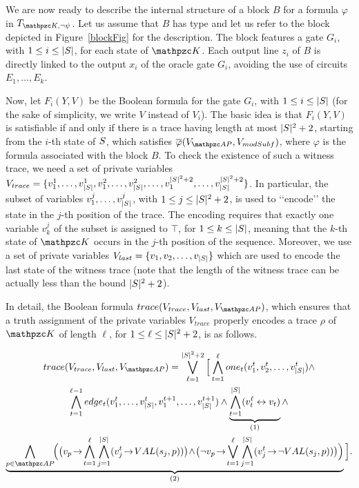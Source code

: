 We are now ready to describe the internal structure of a block $B$ for a formula $\varphi$ in $T_{\Ku,\neg\psi}$. Let us assume that $B$ has type \forw{} and let us refer  to the block depicted in Figure~\ref{blockFig} for the description. The block features a gate $G_i$, with $1 \leq i \leq |S|$, for each state of $\Ku$. Each output line $z_i$ of $B$ is directly linked to the output $x_i$ of the oracle gate $G_i$, avoiding the use of circuits $E_1,\ldots,E_k$.

Now, let $F_i(Y,V)$ be the Boolean formula for the gate $G_i$, with $1\leq i\leq |S|$ (for the sake of simplicity, we write $V$ instead of $V_i$). The basic idea is that $F_i(Y,V)$ is satisfiable if and only if there is a trace having length at most $|S|^2+2$, starting from the $i$-th state of $S$, which satisfies $\overline{\varphi}(V_{\Prop},V_{modSubf})$, where $\varphi$
is the formula associated with the block $B$. To check the existence of such a witness trace,  we need a set of private variables $V_{trace}=\{v_1^1, \ldots, v_{|S|}^1, v_1^2, \ldots, v_{|S|}^2, \ldots, v_1^{|S|^2+2}, \ldots, v_{|S|}^{|S|^2+2}\}$. In particular, 
the subset of variables $v_1^j, \ldots, v_{|S|}^j$, with $1 \leq j \leq |S|^2+2$, 
is used to \lq\lq encode\rq\rq{} the state in the $j$-th position of the trace. The encoding requires that exactly one variable $v_k^j$ of the subset is assigned to $\top$, for $1 \leq k \leq |S|$, meaning that the $k$-th state of $\Ku$ occurs in the $j$-th position of the sequence.
%
Moreover, we use a set of private variables $V_{last}=\{v_1, v_2, \ldots, v_{|S| }\}$ which are used to encode the last state of the witness trace (note that the length of the witness trace can be actually less than the bound  $|S|^2+2$).

In detail, the Boolean formula $trace(V_{trace},V_{last},V_{\Prop})$, which ensures
that a truth assignment of the private variables
$V_{trace}$ properly encodes a trace $\rho$ of $\Ku$ of length $\ell$, for $1 \leq \ell \leq |S|^2+2$, is as follows.

\begin{multline*}
trace(V_{trace},V_{last},V_{\Prop})=
\bigvee_{\ell=1}^{|\States|^2+2}
\Big[\bigwedge_{t=1}^{\ell} one_t(v_1^t, v_2^t, \ldots, v_{|\States|}^t) \wedge \\
\bigwedge_{t=1}^{\ell-1} edge_t(v_1^t, \ldots ,v_{|\States|}^t,v_1^{t+1}, \ldots ,v_{|\States|}^{t+1}) \wedge
\underbrace{\bigwedge_{t=1}^{|\States|} (v^\ell_t \leftrightarrow v_t)}_{(1)} \wedge\\
\underbrace{\bigwedge_{p\in\Prop}\!\! \Big(\big(v_p \!\rightarrow\! \bigwedge_{t=1}^\ell \bigwedge_{j=1}^{|\States|}(v_j^t\!\rightarrow\! VAL(s_j,p))\big) \!\wedge\! \big(\neg v_p \!\rightarrow\! \bigvee_{t=1}^\ell \bigwedge_{j=1}^{|\States|}(v_j^t\!\rightarrow\! \neg VAL(s_j,p))\big)\Big)}_{(2)}
\Big].
\end{multline*}

